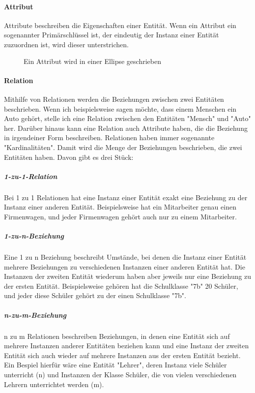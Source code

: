 \documentclass{article}
\begin{document}
	\paragraph{Attribut}
	Attribute beschreiben die Eigenschaften einer Entität. Wenn ein Attribut ein sogenannter Primärschlüssel ist, der eindeutig der Instanz einer Entität zuzuordnen ist, wird dieser unterstrichen.

	\begin{figure}[h!]
		\centering
		
		\caption{Ein Attribut wird in einer Ellipse geschrieben}
	\end{figure}	

	\paragraph{Relation}
	Mithilfe von Relationen werden die Beziehungen zwischen zwei Entitäten beschrieben. Wenn ich beispielsweise sagen möchte, dass einem Menschen ein Auto gehört, stelle ich eine Relation zwischen den Entitäten "Mensch" und "Auto" her. Darüber hinaus kann eine Relation auch Attribute haben, die die Beziehung in irgendeiner Form beschreiben.
	Relationen haben immer sogenannte "Kardinalitäten". Damit wird die Menge der Beziehungen beschrieben, die zwei Entitäten haben. Davon gibt es drei Stück:

	\subparagraph{1-zu-1-Relation}
	Bei 1 zu 1 Relationen hat eine Instanz einer Entität exakt eine Beziehung zu der Instanz einer anderen Entität. Beispielsweise hat ein Mitarbeiter genau einen Firmenwagen, und jeder Firmenwagen gehört auch nur zu einem Mitarbeiter.

	\subparagraph{1-zu-n-Beziehung}
	Eine 1 zu n Beziehung beschreibt Umstände, bei denen die Instanz einer Entität mehrere Beziehungen zu verschiedenen Instanzen einer anderen Entität hat. Die Instanzen der zweiten Entität wiederum haben aber jeweils nur eine Beziehung zu der ersten Entität. Beispielsweise gehören hat die Schulklasse "7b" 20 Schüler, und jeder diese Schüler gehört zu der einen Schulklasse "7b".

	\subparagraph{n-zu-m-Beziehung}
	n zu m Relationen beschreiben Beziehungen, in denen eine Entität sich auf mehrere Instanzen anderer Entitäten beziehen kann und eine Instanz der zweiten Entität sich auch wieder auf mehrere Instanzen aus der ersten Entität bezieht. Ein Bespiel hierfür wäre eine Entität "Lehrer", deren Instanz viele Schüler unterricht (n) und Instanzen der Klasse Schüler, die von vielen verschiedenen Lehrern unterrichtet werden (m).
\end{document}
